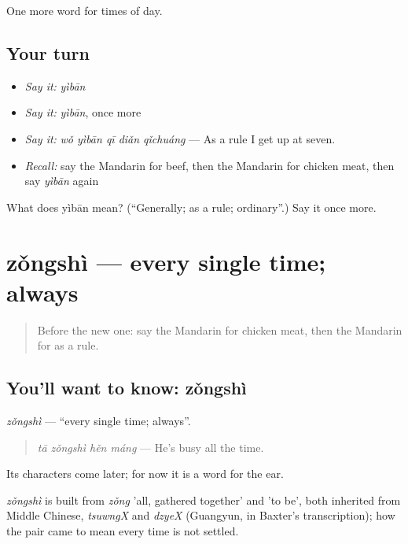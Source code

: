 \begin{grammarlens}[title={What you've built}]
One more word for times of day.
\end{grammarlens}

\subsection*{Your turn}
\begin{itemize}
\raggedright
  \item \emph{Say it:} \emph{yìbān}
  \item \emph{Say it:} \emph{yìbān}, once more
  \item \emph{Say it:} \emph{wǒ yìbān qī diǎn qǐchuáng} — As a rule I get up at seven.
  \item \emph{Recall:} say the Mandarin for beef, then the Mandarin for chicken meat, then say \emph{yìbān} again
\end{itemize}

\begin{tcolorbox}[breakable,colback=teal!4,colframe=teal!35!black,title={Before you move on}]
What does yìbān mean? (\textquotedblleft{}Generally; as a rule; ordinary\textquotedblright{}.) Say it once more.
\end{tcolorbox}
\section[zǒngshì]{zǒngshì — every single time; always}

\label{lesson:ZH-C162-zongshi}



\begin{quote}
Before the new one: say the Mandarin for chicken meat, then the Mandarin for as a rule.
\end{quote}

\subsection*{You'll want to know: zǒngshì}
\emph{zǒngshì} — \textquotedblleft{}every single time; always\textquotedblright{}.

\begin{quote}
\emph{tā zǒngshì hěn máng} — He's busy all the time.
\end{quote}

Its characters come later; for now it is a word for the ear.

\begin{cousinweb}
\emph{zǒngshì} is built from \emph{zǒng} 'all, gathered together' and  'to be', both inherited from Middle Chinese, \emph{tsuwngX} and \emph{dzyeX} (Guangyun, in Baxter's transcription); how the pair came to mean every time is not settled.
\end{cousinweb}

